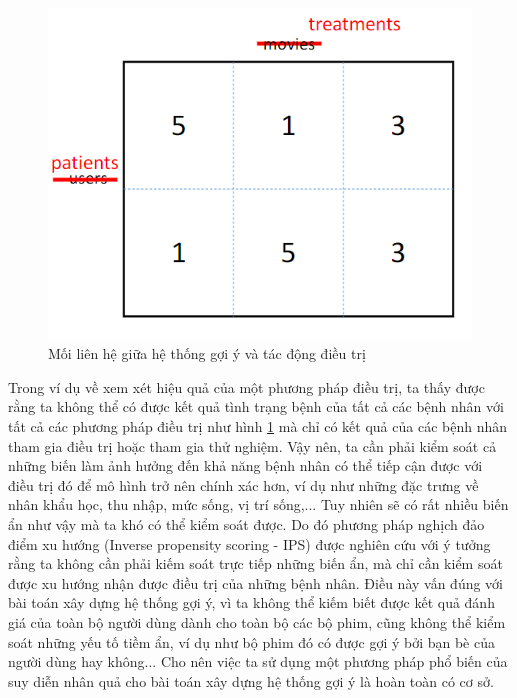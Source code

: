 \begin{figure}[h]
    \centering
    \includegraphics[width=\textwidth]{images/Chapter3/treatment.png}
    \caption{Mối liên hệ giữa hệ thống gợi ý và tác động điều trị}
    \label{fig:3.0_treatment}
\end{figure}

Trong ví dụ về xem xét hiệu quả của một phương pháp điều trị, ta thấy được rằng ta không thể có được kết quả tình trạng bệnh của tất cả các bệnh nhân với tất cả các phương pháp điều trị như hình \ref{fig:3.0_treatment} mà chỉ có kết quả của các bệnh nhân tham gia điều trị hoặc tham gia thử nghiệm. Vậy nên, ta cần phải kiểm soát cả những biến làm ảnh hưởng đến khả năng bệnh nhân có thể tiếp cận được với điều trị đó để mô hình trở nên chính xác hơn, ví dụ như những đặc trưng về nhân khẩu học, thu nhập, mức sống, vị trí sống,... Tuy nhiên sẽ có rất nhiều biến ẩn như vậy mà ta khó có thể kiểm soát  được. Do đó phương pháp nghịch đảo điểm xu hướng (Inverse propensity scoring - IPS) được nghiên cứu với ý tưởng rằng ta không cần phải kiếm soát trực tiếp những biến ẩn, mà chỉ cần kiểm soát được xu hướng nhận được điều trị của những bệnh nhân. Điều này vấn đúng với bài toán xây dựng hệ thống gợi ý, vì ta không thể kiếm biết được kết quả đánh giá của toàn bộ người dùng dành cho toàn bộ các bộ phim, cũng không thể kiểm soát những yếu tố tiềm ẩn, ví dụ như bộ phim đó có được gợi ý bởi bạn bè của người dùng hay không... Cho nên việc ta sử dụng một phương pháp phổ biến của suy diễn nhân quả cho bài toán xây dựng hệ thống gợi ý là hoàn toàn có cơ sở.

